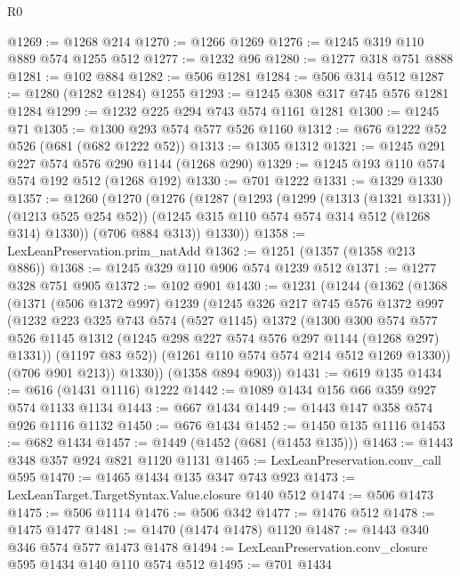 \begin{lexlean}{R0}
\begin{coremodule}
@1269 := @1268 @214
@1270 := @1266 @1269
@1276 := @1245 @319 @110 @889 @574 @1255 @512
@1277 := @1232 @96
@1280 := @1277 @318 @751 @888
@1281 := @102 @884
@1282 := @506 @1281
@1284 := @506 @314 @512
@1287 := @1280 (@1282 @1284) @1255
@1293 := @1245 @308 @317 @745 @576 @1281 @1284
@1299 := @1232 @225 @294 @743 @574 @1161 @1281
@1300 := @1245 @71
@1305 := @1300 @293 @574 @577 @526 @1160
@1312 := @676 @1222 @52 @526 (@681 (@682 @1222 @52))
@1313 := @1305 @1312
@1321 := @1245 @291 @227 @574 @576 @290 @1144 (@1268 @290)
@1329 := @1245 @193 @110 @574 @574 @192 @512 (@1268 @192)
@1330 := @701 @1222
@1331 := @1329 @1330
@1357 := @1260
    (@1270
      (@1276
        (@1287
          (@1293
            (@1299 (@1313 (@1321 @1331)) (@1213 @525 @254 @52))
            (@1245 @315 @110 @574 @574 @314 @512 (@1268 @314) @1330))
          (@706 @884 @313))
        @1330))
@1358 := LexLeanPreservation.prim_natAdd
@1362 := @1251 (@1357 (@1358 @213 @886))
@1368 := @1245 @329 @110 @906 @574 @1239 @512
@1371 := @1277 @328 @751 @905
@1372 := @102 @901
@1430 := @1231
    (@1244
      (@1362
        (@1368
          (@1371
            (@506 @1372 @997)
            @1239
            (@1245
              @326
              @217
              @745
              @576
              @1372
              @997
              (@1232
                @223
                @325
                @743
                @574
                (@527 @1145)
                @1372
                (@1300
                  @300
                  @574
                  @577
                  @526
                  @1145
                  @1312
                  (@1245 @298 @227 @574 @576 @297 @1144 (@1268 @297) @1331))
                (@1197 @83 @52))
              (@1261 @110 @574 @574 @214 @512 @1269 @1330))
            (@706 @901 @213))
          @1330))
      (@1358 @894 @903))
@1431 := @619 @135
@1434 := @616 (@1431 @1116) @1222
@1442 := @1089 @1434 @156 @66 @359 @927 @574 @1133 @1134
@1443 := @667 @1434
@1449 := @1443 @147 @358 @574 @926 @1116 @1132
@1450 := @676 @1434
@1452 := @1450 @135 @1116
@1453 := @682 @1434
@1457 := @1449 (@1452 (@681 (@1453 @135)))
@1463 := @1443 @348 @357 @924 @821 @1120 @1131
@1465 := LexLeanPreservation.conv_call @595
@1470 := @1465 @1434 @135 @347 @743 @923
@1473 := LexLeanTarget.TargetSyntax.Value.closure @140 @512
@1474 := @506 @1473
@1475 := @506 @1114
@1476 := @506 @342
@1477 := @1476 @512
@1478 := @1475 @1477
@1481 := @1470 (@1474 @1478) @1120
@1487 := @1443 @340 @346 @574 @577 @1473 @1478
@1494 := LexLeanPreservation.conv_closure @595 @1434 @140 @110 @574 @512
@1495 := @701 @1434

\end{coremodule}
\end{lexlean}
